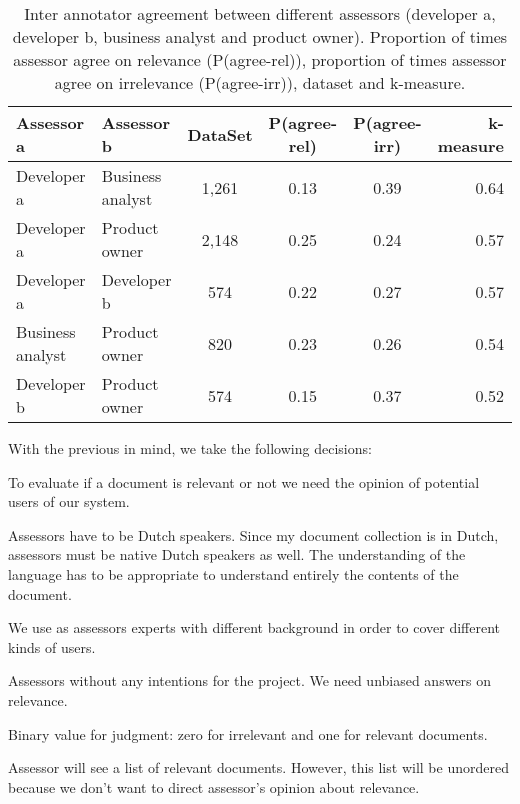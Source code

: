 \begin{table}[H]
\begin{center}
\footnotesize
\caption{Inter annotator agreement between different assessors (developer a, developer b, business analyst and product owner). Proportion of times assessor agree on relevance (P(agree-rel)), proportion of times assessor agree on irrelevance (P(agree-irr)), dataset and k-measure. }
\begin{tabular}{llcccr}
\midrule
 Assessor a & Assessor b & DataSet & P(agree-rel) & P(agree-irr) & k-measure \\
 \midrule
	Developer a & Business analyst & 1,261 & 0.13 & 0.39 & 0.64 \\
	Developer a & Product owner & 2,148 & 0.25 & 0.24 & 0.57 \\
	Developer a & Developer b & 574 & 0.22 & 0.27 & 0.57 \\
	Business analyst & Product owner & 820 & 0.23 & 0.26 & 0.54 \\
	Developer b & Product owner & 574 & 0.15 & 0.37 & 0.52 \\
\bottomrule
\end{tabular}
\end{center}
\end{table}


With the previous in mind, we take the following decisions:

\begin{list}{.}{}
\item{To evaluate if a document is relevant or not  we need the opinion of potential users of our system.}
\item{Assessors have to be Dutch speakers. Since my document collection is in Dutch, assessors must be native Dutch speakers as well. The understanding of the language has to be appropriate to understand entirely the contents of the document.}
\item{We use as assessors experts with different background in order to cover different kinds of users.}
\item{Assessors without any intentions for the project. We need unbiased answers on relevance.}
\item{Binary value for judgment: zero for irrelevant and one for relevant documents.}
\item{Assessor will see a list of relevant documents. However, this list will be unordered because we don't want to direct assessor's opinion about relevance.}
\end{list}




